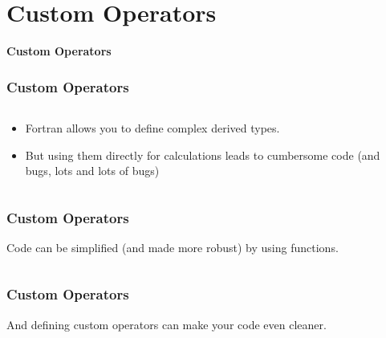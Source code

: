\section{Custom Operators}

\begin{frame}
	\centering
	\Huge \textbf{Custom Operators}
\end{frame}

\begin{frame}[fragile]
  \frametitle{Custom Operators}
  \begin{columns}[T]
    \begin{column}{0.5\textwidth}
      \begin{itemize}
        \item Fortran allows you to define complex derived types.
        \item But using them directly for calculations leads to cumbersome code (and bugs, lots and lots of bugs)
      \end{itemize}
    \end{column}

    \begin{column}{0.5\textwidth}
    
    
    \end{column}
  \end{columns}
\end{frame}

\begin{frame}[fragile]
  \frametitle{Custom Operators}
   Code can be simplified (and made more robust) by using functions.
  \begin{columns}[T]
    \begin{column}{0.5\textwidth}
          
    \end{column}

    \begin{column}{0.5\textwidth}
    
    \end{column}
  \end{columns}
\end{frame}

\begin{frame}[fragile]
  \frametitle{Custom Operators}
   And defining custom operators can make your code even cleaner.
  \begin{columns}[T]
    \begin{column}{0.5\textwidth}
          
    \end{column}

    \begin{column}{0.5\textwidth}
    
    \end{column}
  \end{columns}
\end{frame}


